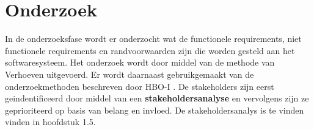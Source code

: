 \chapter{Onderzoek}
\label{chap:Onderzoek}
In de onderzoeksfase wordt er onderzocht wat de functionele requirements, niet functionele requirements en randvoorwaarden zijn die
worden gesteld aan het softwaresysteem. Het onderzoek wordt door middel van de methode van
Verhoeven uitgevoerd. Er wordt daarnaast gebruikgemaakt van de onderzoekmethoden beschreven door
HBO-I \Parencite{HBO-i-reasearch-methods}.
\whitespace
De stakeholders zijn eerst geindentificeerd door middel van een \textbf{stakeholdersanalyse} en vervolgens zijn ze geprioriteerd op basis van belang en invloed.
De stakeholdersanalys is te vinden vinden in hoofdstuk 1.5.
\whitespace
{}





% 
